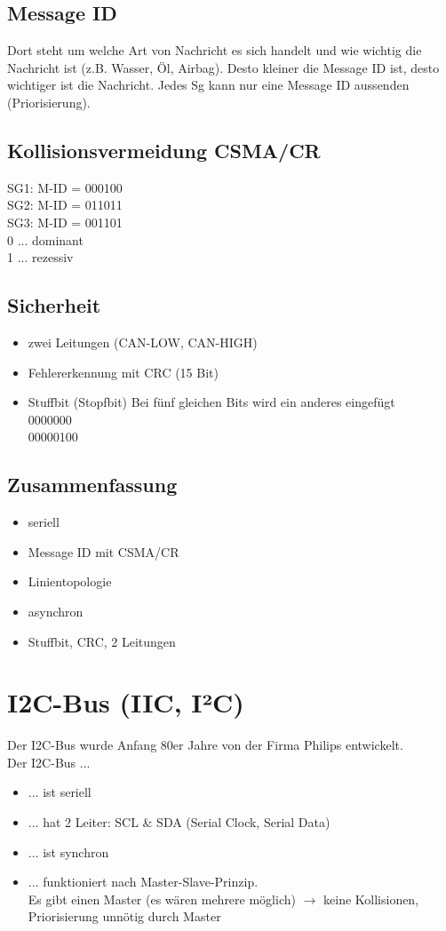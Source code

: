 \subsection*{Message ID}
Dort steht um welche Art von Nachricht es sich handelt und wie wichtig die Nachricht ist (z.B. Wasser, Öl, Airbag). Desto kleiner die Message ID ist, desto wichtiger ist die Nachricht. Jedes Sg kann nur eine Message ID aussenden (Priorisierung).

\subsection*{Kollisionsvermeidung CSMA/CR}
SG1: M-ID = 000100 \\
SG2: M-ID = 011011 \\
SG3: M-ID = 001101 \\
0 ... dominant \\
1 ... rezessiv

\subsection*{Sicherheit}
\begin{itemize}
	\item zwei Leitungen (CAN-LOW, CAN-HIGH)
	\item Fehlererkennung mit CRC (15 Bit)
	\item Stuffbit (Stopfbit) Bei fünf gleichen Bits wird ein anderes eingefügt \\
	0000000 \\
	00000100
\end{itemize}

\subsection*{Zusammenfassung}
\begin{itemize}
	\item seriell
	\item Message ID mit CSMA/CR
	\item Linientopologie
	\item asynchron
	\item Stuffbit, CRC, 2 Leitungen
\end{itemize}

\section{I2C-Bus (IIC, I²C)}
Der I2C-Bus wurde Anfang 80er Jahre von der Firma Philips entwickelt. \\
Der I2C-Bus ...
\begin{itemize}
	\item ... ist seriell
	\item ... hat 2 Leiter: SCL \& SDA (Serial Clock, Serial Data)
	\item ... ist synchron
	\item ... funktioniert nach Master-Slave-Prinzip. \\
	Es gibt einen Master (es wären mehrere möglich) $\rightarrow$ keine Kollisionen, Priorisierung unnötig durch Master
\end{itemize}

